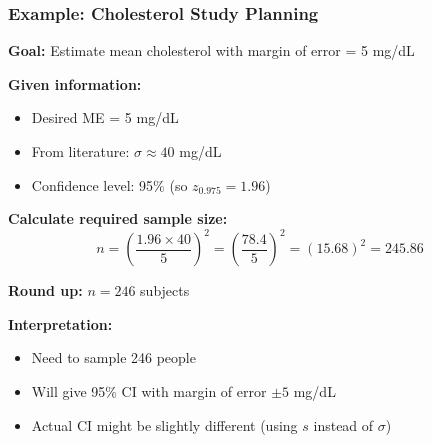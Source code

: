 \documentclass{beamer}
\begin{document}
\begin{frame}
\frametitle{Example: Cholesterol Study Planning}
\textbf{Goal:} Estimate mean cholesterol with margin of error = 5 mg/dL

\vspace{0.3cm}
\textbf{Given information:}
\begin{itemize}
\item Desired ME = 5 mg/dL
\item From literature: $\sigma \approx 40$ mg/dL
\item Confidence level: 95\% (so $z_{0.975} = 1.96$)
\end{itemize}

\vspace{0.3cm}
\textbf{Calculate required sample size:}
$$n = \left(\frac{1.96 \times 40}{5}\right)^2 = \left(\frac{78.4}{5}\right)^2 = (15.68)^2 = 245.86$$

\vspace{0.3cm}
\textbf{Round up:} $n = 246$ subjects

\vspace{0.5cm}
\textbf{Interpretation:}
\begin{itemize}
\item Need to sample 246 people
\item Will give 95\% CI with margin of error $\pm 5$ mg/dL
\item Actual CI might be slightly different (using $s$ instead of $\sigma$)
\end{itemize}
\end{frame}
\end{document}
